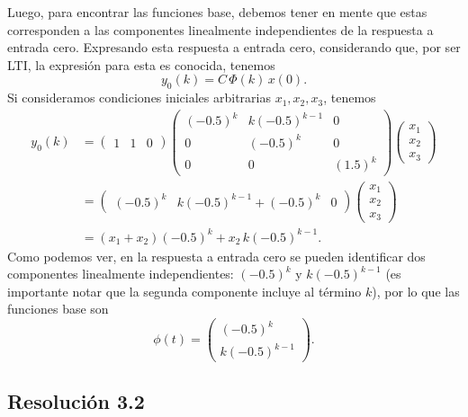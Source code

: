 \documentclass[
  11pt,
  letterpaper,
   addpoints,
  answers
  ]{exam}
\begin{document}
\begin{questions}
\begin{solution}
Luego, para encontrar las funciones base, debemos tener en mente que estas corresponden a las componentes linealmente independientes de la respuesta a entrada cero. Expresando esta respuesta a entrada cero, considerando que, por ser LTI, la expresión para esta es conocida, tenemos
\begin{equation}
y_{0}(k)=C\,\Phi(k)\,x(0).
\tag{4}
\end{equation}
Si consideramos condiciones iniciales arbitrarias $x_{1},x_{2},x_{3}$, tenemos
\begin{align}
y_{0}(k)
&=\begin{pmatrix}1&1&0\end{pmatrix}
\begin{pmatrix}
(-0.5)^{k} & k(-0.5)^{k-1} & 0\\
0          & (-0.5)^{k}    & 0\\
0          & 0              & (1.5)^{k}
\end{pmatrix}
\begin{pmatrix}x_{1}\\ x_{2}\\ x_{3}\end{pmatrix}
\tag{5}\\[2pt]
&=\begin{pmatrix}(-0.5)^{k} & k(-0.5)^{k-1}+(-0.5)^{k} & 0\end{pmatrix}
\begin{pmatrix}x_{1}\\ x_{2}\\ x_{3}\end{pmatrix}
\tag{6}\\
&=(x_{1}+x_{2})(-0.5)^{k}+x_{2}\,k(-0.5)^{k-1}.
\tag{7}
\end{align}
Como podemos ver, en la respuesta a entrada cero se pueden identificar dos componentes linealmente independientes:
$(-0.5)^{k}$ y $k(-0.5)^{k-1}$ (es importante notar que la segunda componente incluye al término $k$), por lo que las funciones base son
\begin{equation}
\phi(t)=
\begin{pmatrix}
(-0.5)^{k}\\[2pt]
k(-0.5)^{k-1}
\end{pmatrix}.
\tag{8}
\end{equation}

\subsection*{Resolución 3.2}


\end{solution}
\end{questions}
\end{document}

